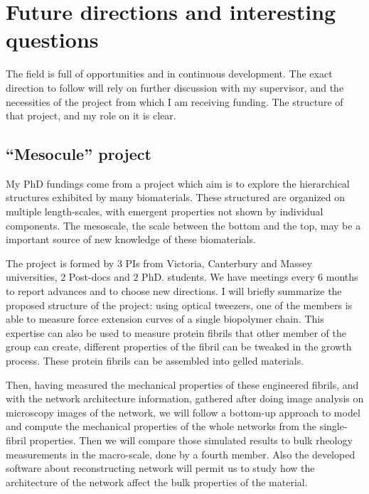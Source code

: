\section{Future directions and interesting questions}

The field is full of opportunities and in continuous development. The exact
direction to follow will rely on further discussion with my supervisor, and the necessities
of the project from which I am receiving funding. The structure of that project,
and my role on it is clear.

\subsection{``Mesocule'' project}
My PhD fundings come from a project which aim is to explore the hierarchical
structures exhibited by many biomaterials. These structured are organized on
multiple length-scales, with emergent properties not shown by individual
components. The mesoscale, the scale between the bottom and the top, may be  a
important source of new knowledge of these biomaterials.

The project is formed by
$3$ PIs from Victoria, Canterbury and Massey universities, $2$ Post-docs
 and $2$ PhD. students. We have meetings every $6$ months to report advances and
 to choose new directions.
I will briefly summarize the proposed structure of the project: using optical
tweezers, one of the members is able to  measure force
extension curves of a single biopolymer chain. This expertise can also be  used
to measure protein fibrils that other member of the group can create,  different
properties of the fibril can be tweaked in the growth process. These protein
fibrils can be assembled into gelled materials.

Then, having measured the mechanical properties of these engineered
fibrils, and with the network architecture information, gathered after doing
image analysis on microscopy images of the network, we will follow a
bottom-up approach \citep{brown_multiscale_2009,schuster_investigating_2012} to
model and compute the mechanical properties of the whole networks from the single-fibril properties.
Then we will compare those simulated results to
bulk rheology measurements in the macro-scale, done by a fourth member.
Also the developed software about reconstructing network will permit us to 
study how the architecture of the network affect the bulk properties of the material.
 





